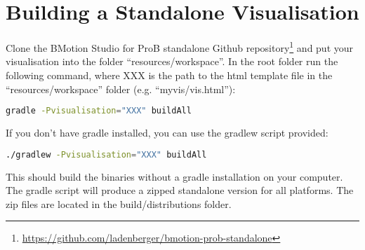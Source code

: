 \section{Building a Standalone Visualisation}
\label{sec:build_standalone}

Clone the BMotion Studio for ProB standalone Github repository\footnote{\url{https://github.com/ladenberger/bmotion-prob-standalone}} and put your visualisation into the folder ``resources/workspace''.
In the root folder run the following command, where XXX is the path to the html template file in the ``resources/workspace'' folder (e.g. ``myvis/vis.html''):
\begin{lstlisting}[language=bash]
gradle -Pvisualisation="XXX" buildAll
\end{lstlisting}


If you don't have gradle installed, you can use the gradlew script provided:
\begin{lstlisting}[language=bash]
./gradlew -Pvisualisation="XXX" buildAll
\end{lstlisting}

This should build the binaries without a gradle installation on your computer.
The gradle script will produce a zipped standalone version for all platforms. The zip files are located in the build/distributions folder.


